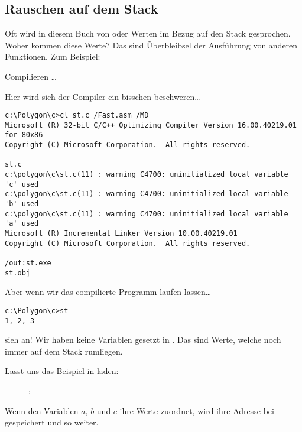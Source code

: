 \subsection{Rauschen auf dem Stack}

Oft wird in diesem Buch von  oder  Werten im Bezug
auf den Stack gesprochen. Woher kommen diese Werte? Das sind Überbleibsel der
Ausführung von anderen Funktionen. Zum Beispiel: 



Compilieren \dots



Hier wird sich der Compiler ein bisschen beschweren\dots

\begin{lstlisting}
c:\Polygon\c>cl st.c /Fast.asm /MD
Microsoft (R) 32-bit C/C++ Optimizing Compiler Version 16.00.40219.01 for 80x86
Copyright (C) Microsoft Corporation.  All rights reserved.

st.c
c:\polygon\c\st.c(11) : warning C4700: uninitialized local variable 'c' used
c:\polygon\c\st.c(11) : warning C4700: uninitialized local variable 'b' used
c:\polygon\c\st.c(11) : warning C4700: uninitialized local variable 'a' used
Microsoft (R) Incremental Linker Version 10.00.40219.01
Copyright (C) Microsoft Corporation.  All rights reserved.

/out:st.exe
st.obj
\end{lstlisting}

Aber wenn wir das compilierte Programm laufen lassen\dots

\begin{lstlisting}
c:\Polygon\c>st
1, 2, 3
\end{lstlisting}

sieh an! Wir haben keine Variablen gesetzt in .
Das sind  Werte, welche noch immer auf dem Stack rumliegen.

\clearpage
Lasst uns das Beispiel in \olly laden:

\begin{figure}[H]
\centering
{}
\caption{\olly: }
\label{fig:stack_noise_olly1}
\end{figure}

Wenn  den Variablen $a$, $b$ und $c$ ihre Werte zuordnet, wird ihre Adresse bei  gespeichert und so weiter. 

